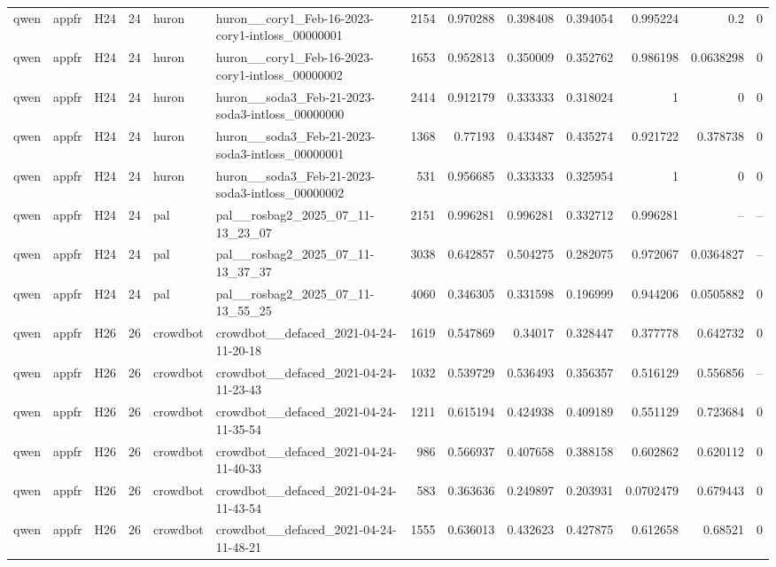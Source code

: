 \begin{longtable}{lllrllrrrrrrr}
qwen & appfr & H24 & 24 & huron & huron\_\_cory1\_Feb-16-2023-cory1-intloss\_00000001 & 2154 & 0.970288 & 0.398408 & 0.394054 & 0.995224 & 0.2 & 0 \\
qwen & appfr & H24 & 24 & huron & huron\_\_cory1\_Feb-16-2023-cory1-intloss\_00000002 & 1653 & 0.952813 & 0.350009 & 0.352762 & 0.986198 & 0.0638298 & 0 \\
qwen & appfr & H24 & 24 & huron & huron\_\_soda3\_Feb-21-2023-soda3-intloss\_00000000 & 2414 & 0.912179 & 0.333333 & 0.318024 & 1 & 0 & 0 \\
qwen & appfr & H24 & 24 & huron & huron\_\_soda3\_Feb-21-2023-soda3-intloss\_00000001 & 1368 & 0.77193 & 0.433487 & 0.435274 & 0.921722 & 0.378738 & 0 \\
qwen & appfr & H24 & 24 & huron & huron\_\_soda3\_Feb-21-2023-soda3-intloss\_00000002 & 531 & 0.956685 & 0.333333 & 0.325954 & 1 & 0 & 0 \\
qwen & appfr & H24 & 24 & pal & pal\_\_rosbag2\_2025\_07\_11-13\_23\_07 & 2151 & 0.996281 & 0.996281 & 0.332712 & 0.996281 & -- & -- \\
qwen & appfr & H24 & 24 & pal & pal\_\_rosbag2\_2025\_07\_11-13\_37\_37 & 3038 & 0.642857 & 0.504275 & 0.282075 & 0.972067 & 0.0364827 & -- \\
qwen & appfr & H24 & 24 & pal & pal\_\_rosbag2\_2025\_07\_11-13\_55\_25 & 4060 & 0.346305 & 0.331598 & 0.196999 & 0.944206 & 0.0505882 & 0 \\
qwen & appfr & H26 & 26 & crowdbot & crowdbot\_\_defaced\_2021-04-24-11-20-18 & 1619 & 0.547869 & 0.34017 & 0.328447 & 0.377778 & 0.642732 & 0 \\
qwen & appfr & H26 & 26 & crowdbot & crowdbot\_\_defaced\_2021-04-24-11-23-43 & 1032 & 0.539729 & 0.536493 & 0.356357 & 0.516129 & 0.556856 & -- \\
qwen & appfr & H26 & 26 & crowdbot & crowdbot\_\_defaced\_2021-04-24-11-35-54 & 1211 & 0.615194 & 0.424938 & 0.409189 & 0.551129 & 0.723684 & 0 \\
qwen & appfr & H26 & 26 & crowdbot & crowdbot\_\_defaced\_2021-04-24-11-40-33 & 986 & 0.566937 & 0.407658 & 0.388158 & 0.602862 & 0.620112 & 0 \\
qwen & appfr & H26 & 26 & crowdbot & crowdbot\_\_defaced\_2021-04-24-11-43-54 & 583 & 0.363636 & 0.249897 & 0.203931 & 0.0702479 & 0.679443 & 0 \\
qwen & appfr & H26 & 26 & crowdbot & crowdbot\_\_defaced\_2021-04-24-11-48-21 & 1555 & 0.636013 & 0.432623 & 0.427875 & 0.612658 & 0.68521 & 0 \\

\end{longtable}
